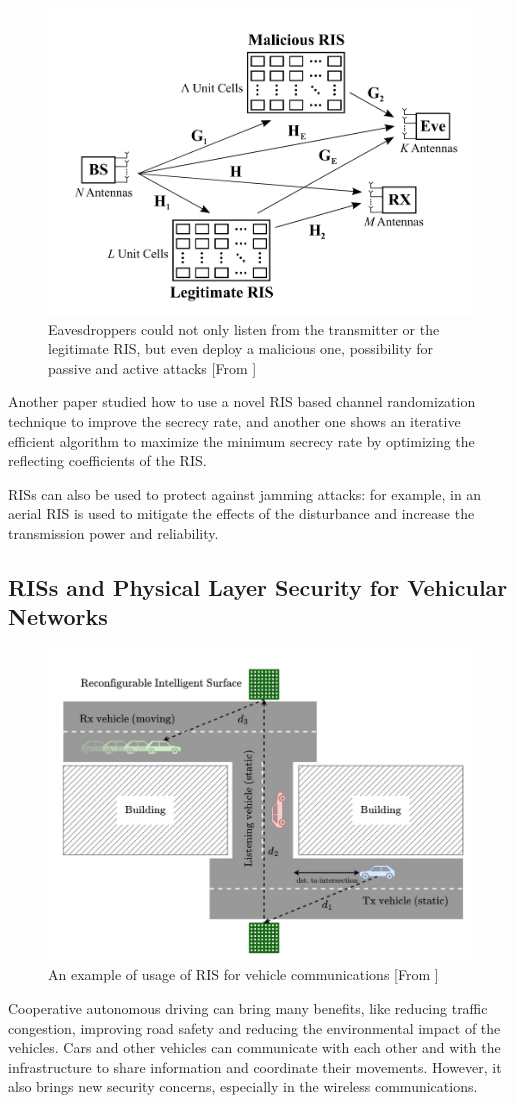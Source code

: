 \begin{figure}[H]
  \centering
  \includegraphics[width=0.5\linewidth]{imgs/RIS malicious.png}
  \caption{Eavesdroppers could not only listen from the transmitter or the legitimate RIS, but even deploy a malicious one, possibility for passive and active attacks [From \cite{10143983}]}
\end{figure}

Another paper \cite{s21041439} studied how to use a novel RIS based channel randomization technique to improve the secrecy rate, and another one \cite{8742603} shows an iterative efficient algorithm to maximize the minimum secrecy rate by optimizing the reflecting coefficients of the RIS.

RISs can also be used to protect against jamming attacks: for example, in \cite{9424472} an aerial RIS is used to mitigate the effects of the disturbance and increase the transmission power and reliability.

\subsection{RISs and Physical Layer Security for Vehicular Networks}

\begin{figure}[H]
  \centering
  \includegraphics[width=0.5\linewidth]{imgs/RIS vehicles.png}
  \caption{An example of usage of RIS for vehicle communications [From \cite{SEGATA2024110443}]}
\end{figure}

Cooperative autonomous driving can bring many benefits, like reducing traffic congestion, improving road safety and reducing the environmental impact of the vehicles. Cars and other vehicles can communicate with each other and with the infrastructure to share information and coordinate their movements. However, it also brings new security concerns, especially in the wireless communications.

